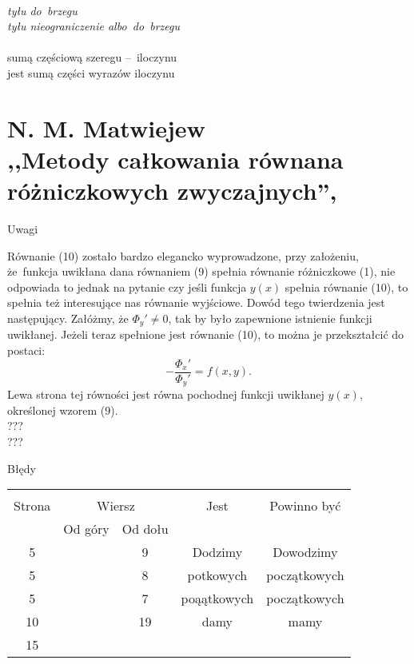\documentclass[a4paper,11pt]{article}
\numberwithin{equation}{section}
\begin{document}
\noindent
{} \\
\Jest \textit{tyłu do~brzegu} \\
\PowinnoByc \textit{tyłu nieograniczenie albo~do~brzegu} \\
 \\
\Jest sumą częściową szeregu --~iloczynu \\
\PowinnoByc  jest sumą części wyrazów iloczynu \\





\section{
  N. M. Matwiejew \\
  ,,Metody całkowania równana różniczkowych zwyczajnych'',
  \cite{MatwiejewMetodyCalkowaniaRownanRozniczkowychZwyczajnych82} }


Uwagi

 Równanie (10) zostało bardzo elegancko wyprowadzone,
przy założeniu, że~funkcja uwikłana dana równaniem (9) spełnia
równanie różniczkowe (1), nie odpowiada to jednak na pytanie czy jeśli
funkcja $y( x )$ spełnia równanie (10), to spełnia też interesujące
nas równanie wyjściowe. Dowód tego twierdzenia jest następujący.
Załóżmy, że $\Phi_{ y }' \neq 0$, tak by było zapewnione istnienie
funkcji uwikłanej. Jeżeli teraz spełnione jest równanie (10), to można
je przekształcić do postaci:
\begin{equation}
  -\frac{ \Phi_{ x }' }{ \Phi_{ y }' } = f( x, y ).
\end{equation}
Lewa strona tej równości jest równa pochodnej funkcji uwikłanej
$y( x )$, określonej wzorem (9). \\
??? \\
 ???


Błędy
\begin{center}
  \begin{tabular}{|c|c|c|c|c|}
    \hline
    & \multicolumn{2}{c|}{} & & \\
    Strona & \multicolumn{2}{c|}{Wiersz} & Jest
                              & Powinno być \\ \cline{2-3}
    & Od góry & Od dołu & & \\
    \hline
    5   & &  9 & Dodzimy & Dowodzimy \\
    5   & &  8 & potkowych & początkowych \\
    5   & &  7 & poąątkowych & początkowych \\
    10  & & 19 & damy & mamy \\
    15  & & & & \\
    \hline
  \end{tabular}
\end{center}
\end{document}
